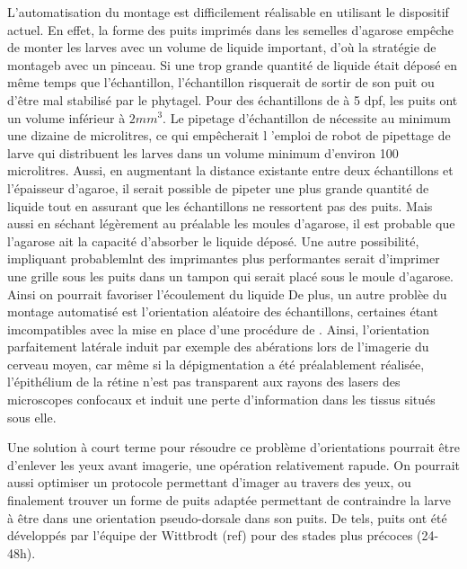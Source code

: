 \documentclass[\main/main.tex]{subfiles}
\begin{document}
L'automatisation du montage est difficilement réalisable en utilisant le dispositif actuel.
%
En effet,
la forme des puits imprimés dans les semelles d'agarose empêche de monter les larves avec un volume de liquide important, d'où la stratégie de montageb avec un pinceau.
%
Si une trop grande quantité de liquide était déposé en même temps que l'échantillon,
l'échantillon risquerait de sortir de son puit ou d'être mal stabilisé par le phytagel.
%
Pour des échantillons de \pz{} à 5 dpf, les puits ont un volume inférieur à $2 mm^{3}$. 
%
Le pipetage d'échantillon de \pz{} nécessite au minimum une dizaine de microlitres, ce qui empêcherait l 'emploi de robot de pipettage de larve qui distribuent les larves dans un volume minimum d'environ 100 microlitres.
%
Aussi, en augmentant la distance existante entre deux échantillons et l'épaisseur d'agaroe,
il serait possible de pipeter une plus grande quantité de liquide tout en assurant que les échantillons ne ressortent pas des puits. Mais aussi en séchant légèrement au préalable les moules d'agarose, il est probable que l'agarose ait la capacité d'absorber le liquide déposé. Une autre possibilité, impliquant probablemlnt des imprimantes plus performantes serait d'imprimer une grille sous les puits dans un tampon qui serait placé sous le moule d'agarose. Ainsi on pourrait favoriser l'écoulement du liquide
%
%
De plus, un autre problèe du montage automatisé est l'orientation aléatoire des échantillons, certaines étant imcompatibles avec la mise en place d'une procédure de \hcs{}.
%
Ainsi, l'orientation parfaitement latérale induit par exemple des abérations lors de l'imagerie du cerveau moyen, car même si la dépigmentation a été préalablement réalisée, l'épithélium de la rétine n'est pas transparent aux rayons des lasers des microscopes confocaux et induit une perte d'information dans les tissus situés sous elle.

%
Une solution à court terme pour résoudre ce problème d'orientations pourrait être d'enlever les yeux avant imagerie, une opération relativement rapude. On pourrait aussi optimiser un protocole permettant d'imager au travers des yeux, ou finalement trouver un forme de puits adaptée permettant de contraindre la larve à être dans une orientation pseudo-dorsale dans son puits. De tels, puits ont été développés par l'équipe der Wittbrodt (ref) pour des stades plus précoces (24-48h).
\end{document}
